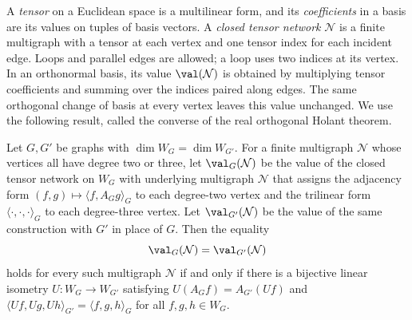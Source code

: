 A \emph{tensor} on a Euclidean space is a multilinear form, and its
\emph{coefficients} in a basis are its values on tuples of basis
vectors.
A \emph{closed tensor network} $\mathcal N$ is a finite multigraph with a tensor at
each vertex and one tensor index for each incident edge.
Loops and parallel edges are allowed; a loop uses two indices at its vertex.
In an orthonormal basis, its value $\val(\mathcal N)$ is obtained by multiplying
tensor coefficients and summing over the indices paired along edges.
The same orthogonal change of basis at every vertex leaves this value unchanged.
We use the following result, called the converse of the real orthogonal
Holant theorem.
\begin{theorem*}
Let $G,G'$ be graphs with $\dim W_G=\dim W_{G'}$.
For a finite multigraph $\mathcal N$ whose vertices all have degree two or
three, let $\val_G(\mathcal N)$ be the value of the closed tensor network
on $W_G$ with underlying multigraph $\mathcal N$ that assigns the adjacency form
$(f,g)\mapsto\langle f,A_Gg\rangle_G$ to each degree-two vertex and
the trilinear form $\langle\cdot,\cdot,\cdot\rangle_G$ to each
degree-three vertex. Let $\val_{G'}(\mathcal N)$ be the value of the same
construction with $G'$ in place of $G$.
Then the equality
\begin{equation}\label{eq:image-all-networks}
 \val_G(\mathcal N)=\val_{G'}(\mathcal N)
\end{equation}
holds for every such multigraph $\mathcal N$ if and only if there is a bijective
linear isometry $U:W_G\to W_{G'}$ satisfying $U(A_Gf)=A_{G'}(Uf)$ and
$\langle Uf,Ug,Uh\rangle_{G'}=\langle f,g,h\rangle_G$ for all $f,g,h\in W_G$.
\end{theorem*}

